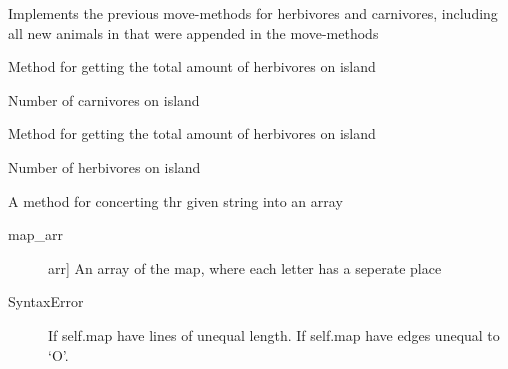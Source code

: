 \documentclass[a4paper,10pt,english]{sphinxmanual}
\begin{document}
\begin{fulllineitems}
\begin{fulllineitems}
Implements the previous move-methods for herbivores and carnivores,
including all new animals in that were appended in the move-methods

\end{fulllineitems}


\begin{fulllineitems}
\label{\detokenize{island:biosim.island.Island.number_of_carnivores_island}}
Method for getting the total amount of herbivores on island

Number of carnivores on island

\end{fulllineitems}


\begin{fulllineitems}
\label{\detokenize{island:biosim.island.Island.number_of_herbivores_island}}
Method for getting the total amount of herbivores on island

Number of herbivores on island

\end{fulllineitems}


\begin{fulllineitems}
\label{\detokenize{island:biosim.island.Island.string_to_array}}
A method for concerting thr given string into an array
\begin{description}
\item[{map\_arr}] \leavevmode{[}arr{]}
An array of the map, where each letter has a seperate place

\end{description}
\begin{description}
\item[{SyntaxError}] \leavevmode
If self.map have lines of unequal length.
If self.map have edges unequal to `O'.

\end{description}

\end{fulllineitems}


\end{fulllineitems}
\end{document}
